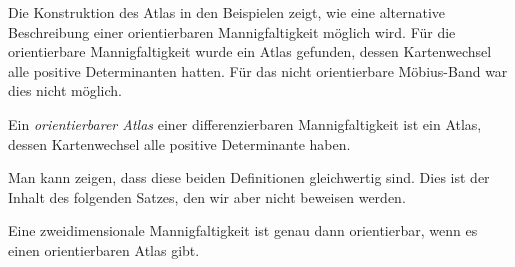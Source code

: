 Die Konstruktion des Atlas in den Beispielen zeigt, wie eine
alternative Beschreibung einer orientierbaren Mannigfaltigkeit
möglich wird.
Für die orientierbare Mannigfaltigkeit wurde ein Atlas gefunden,
dessen Kartenwechsel alle positive Determinanten hatten.
Für das nicht orientierbare Möbius-Band war dies nicht möglich.

\begin{definition}
Ein \emph{orientierbarer Atlas} einer differenzierbaren Mannigfaltigkeit
%
ist ein Atlas, dessen Kartenwechsel alle positive Determinante haben.
%
\end{definition}

Man kann zeigen, dass diese beiden Definitionen gleichwertig sind.
Dies ist der Inhalt des folgenden Satzes, den wir aber nicht
beweisen werden.

\begin{satz}
Eine zweidimensionale Mannigfaltigkeit ist genau dann orientierbar,
wenn es einen orientierbaren Atlas gibt.
\end{satz}



